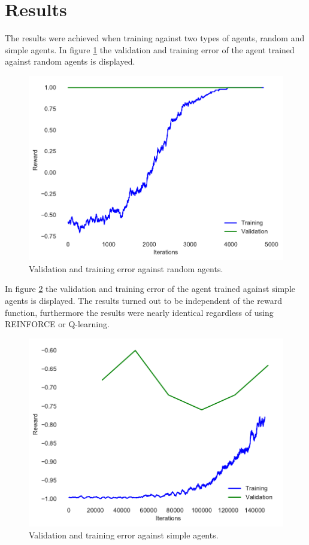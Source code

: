 \section{Results}
The results were achieved when training against two types of agents, random and simple agents. In figure \ref{fig:resultsrandom} the validation and training error of the agent trained against random agents is displayed.

\begin{figure}[htb]
    \centerline{\includegraphics[width=1.0\linewidth]{docs/article/inputs/random_train_val.pdf}}
    \caption{Validation and training error against random agents.}\label{fig:resultsrandom}
\end{figure}

In figure \ref{fig:resultssimple} the validation and training error of the agent trained against simple agents is displayed. The results turned out to be independent of the reward function, furthermore the results were nearly identical regardless of using REINFORCE or Q-learning.

\begin{figure}[htb]
    \centerline{\includegraphics[width=1.0\linewidth]{docs/article/inputs/train_val.pdf}}
    \caption{Validation and training error against simple agents.}\label{fig:resultssimple}
\end{figure}


